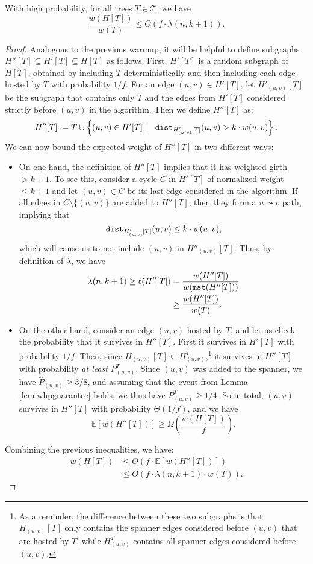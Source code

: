 \begin{lemma} \label{lem:polyhostbound}
With high probability, for all trees $T \in \mathcal{T}$, we have
$$\frac{w(H[T])}{w(T)} \le O\left(f \cdot \lambda(n, k+1)\right).$$
\end{lemma}
\begin{proof}
Analogous to the previous warmup, it will be helpful to define subgraphs $H''[T] \subseteq H'[T] \subseteq H[T]$ as follows.
First, $H'[T]$ is a random subgraph of $H[T]$, obtained by including $T$ deterministically and then including each edge hosted by $T$ with probability $1/f$.
For an edge $(u, v) \in H'[T]$, let $H'_{(u, v)}[T]$ be the subgraph that contains only $T$ and the edges from $H'[T]$ considered strictly before $(u, v)$ in the algorithm.
Then we define $H''[T]$ as:
$$H''[T] := T \cup \left\{ (u, v) \in H'[T] \ \mid \ \texttt{dist}_{H'_{(u, v)}[T]}(u, v) > k \cdot w(u, v)\right\}.$$
We can now bound the expected weight of $H''[T]$ in two different ways:
\begin{itemize}
\item On one hand, the definition of $H''[T]$ implies that it has weighted girth $>k+1$.
To see this, consider a cycle $C$ in $H'[T]$ of normalized weight $\le k+1$ and let $(u, v) \in C$ be its last edge considered in the algorithm.
If all edges in $C \setminus \{(u, v)\}$ are added to $H''[T]$, then they form a $u \leadsto v$ path, implying that
$$\texttt{dist}_{H'_{(u, v)}[T]}(u, v) \le k \cdot w(u, v),$$
which will cause us to not include $(u, v)$ in $H''_{(u, v)}[T]$.
Thus, by definition of $\lambda$, we have
\begin{align*}
\lambda(n, k+1) \ge \ell(H''[T]) &= \frac{w(H''[T])}{w(\texttt{mst}(H''[T]))}\\
&\ge \frac{w(H''[T])}{w(T)}.
\end{align*}

\item On the other hand, consider an edge $(u, v)$ hosted by $T$, and let us check the probability that it survives in $H''[T]$.
First it survives in $H'[T]$ with probability $1/f$.
Then, since $H_{(u, v)}[T] \subseteq H_{(u, v)}^T$,\footnote{As a reminder, the difference between these two subgraphs is that $H_{(u, v)}[T]$ only contains the spanner edges considered before $(u, v)$ that are hosted by $T$, while $H_{(u, v)}^T$ contains all spanner edges considered before $(u, v)$.} it survives in $H''[T]$ with probability \emph{at least} $P_{(u, v)}^T$.
Since $(u, v)$ was added to the spanner, we have $\widehat{P}_{(u, v)} \ge 3/8$, and assuming that the event from Lemma \ref{lem:whpguarantee} holds, we thus have $P_{(u, v)}^T \ge 1/4$.
So in total, $(u, v)$ survives in $H''[T]$ with probability $\Theta(1/f)$, and we have
$$\mathbb{E}\left[w(H''[T])\right] \ge \Omega\left(\frac{w(H[T])}{f} \right).$$
\end{itemize}

Combining the previous inequalities, we have:
\begin{align*}
w(H[T]) &\le O\left(f \cdot \mathbb{E}\left[w(H''[T])\right]\right)\\
&\le O\left(f \cdot \lambda(n, k+1) \cdot w(T)\right). \tag*{\qedhere}
\end{align*}
\end{proof}

